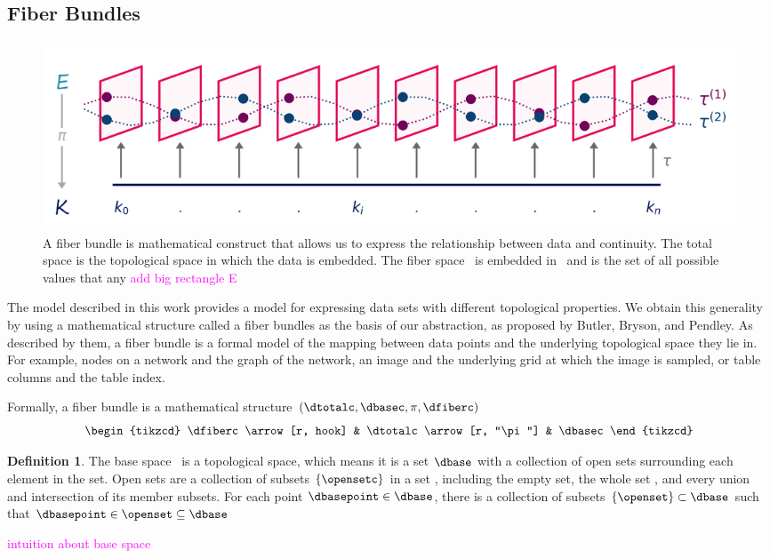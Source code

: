 \documentclass[10pt,journal,compsoc]{IEEEtran}
\newcommand{\note}[1]{\textcolor{magenta}{#1}}
\theoremstyle{definition}
\newtheorem{definition}{Definition}[section]
\theoremstyle{remark}
\begin{document}
\subsection{Fiber Bundles}
\label{sec:related-work:fiber-bundles}
\begin{figure}[h!]
  \includegraphics[width=\columnwidth]{fiberbundle.png}
  \caption{A fiber bundle is mathematical construct that allows us to express the relationship between data and continuity. The \textcolor{total}{total} space \dtotal is the topological space in which the data is embedded. The \textcolor{fiber}{fiber} space \dfiber\ is embedded in \dtotal\ and is the set of all possible values that any
  \note{add big rectangle E}}
  \label{fig:related-work:fiber-bundle}
\end{figure}

The model described in this work provides a model for expressing data sets with different topological properties. 
We obtain this generality by using a mathematical structure called a fiber bundles as the basis of our abstraction, as proposed by Butler, Bryson, and Pendley\cite{butlerVisualizationModelBased1989,
butlerVectorBundleClassesForm1992}. As described by them, a fiber bundle is a formal model of the mapping between data points and the underlying topological space they lie in. For example, nodes on a network and the graph of the network, an image and the underlying grid at which the image is sampled, or table columns and the table index.

Formally, a fiber bundle is a mathematical structure $(\dtotalc, \dbasec, \pi, \dfiberc)$
\begin{equation}
  \label{eq:fiber_bundle}
  \begin{tikzcd}
      \dfiberc \arrow[r, hook] & \dtotalc \arrow[r, "\pi"] & \dbasec
  \end{tikzcd}
\end{equation}

\begin{definition}
The \textcolor{base}{base space} \dbasec\ is a topological space, which means it is a set $\dbase$ with a collection of open sets \cite{TopologyVsTopology} surrounding each element in the set. Open sets are a collection of subsets $\{\opensetc\}$ in a set \dbase, including the empty set, the whole set \dbase, and every union and intersection of its member subsets. For each point $\dbasepoint \in \dbase$, there is a collection of subsets $\{\openset\} \subset \dbase$ such that $\dbasepoint \in \openset \subseteq \dbase$ \cite{spanier1989algebraic, bradleyTopologyCategoricalApproach2020}  
\end{definition}
\note{intuition about base space}
\end{document}
